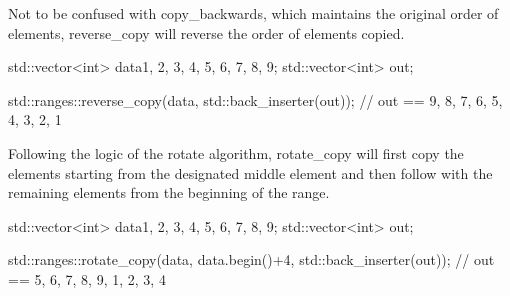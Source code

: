 Not to be confused with copy\_backwards, which maintains the original order of elements, reverse\_copy will reverse the order of elements copied.

\begin{box-note}
\begin{cppcode}
std::vector<int> data{1, 2, 3, 4, 5, 6, 7, 8, 9};
std::vector<int> out;

std::ranges::reverse_copy(data, std::back_inserter(out));
// out == { 9, 8, 7, 6, 5, 4, 3, 2, 1 }
\end{cppcode}
\end{box-note}



Following the logic of the rotate algorithm, rotate\_copy will first copy the elements starting from the designated middle element and then follow with the remaining elements from the beginning of the range.

\begin{box-note}
\begin{cppcode}
std::vector<int> data{1, 2, 3, 4, 5, 6, 7, 8, 9};
std::vector<int> out;

std::ranges::rotate_copy(data, data.begin()+4, std::back_inserter(out));
// out == { 5, 6, 7, 8, 9, 1, 2, 3, 4 }
\end{cppcode}
\end{box-note}
